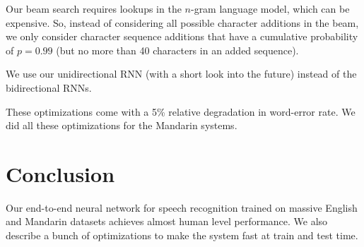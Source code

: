 \documentclass[a4paper]{article}
\begin{document}
Our beam search requires lookups in the $n$-gram language model, which can
be expensive. So, instead of considering all possible character additions in
the beam, we only consider character sequence additions that have a cumulative
probability of $p = 0.99$ (but no more than 40 characters in an added sequence).

We use our unidirectional RNN (with a short look into the future) instead of
the bidirectional RNNs.

These optimizations come with a 5\% relative degradation in word-error rate.
We did all these optimizations for the Mandarin systems.

\section{Conclusion}
Our end-to-end neural network for speech recognition trained on massive English
and Mandarin datasets achieves almost human level performance. We also
describe a bunch of optimizations to make the system fast at train and test
time.
\end{document}
